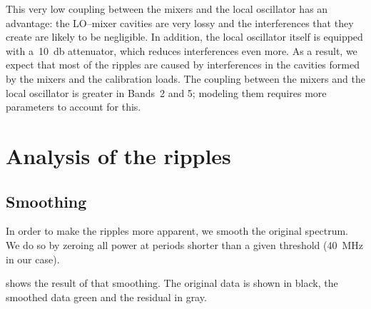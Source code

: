 This very low coupling between the mixers and the local oscillator has an advantage: the LO--mixer cavities are very lossy and the interferences that they create are likely to be negligible.
In addition, the local oscillator itself is equipped with a~\SI{10}{\decibel} attenuator, which reduces interferences even more.
As a result, we expect that most of the ripples are caused by interferences in the cavities formed by the mixers and the calibration loads.
The coupling between the mixers and the local oscillator is greater in Bands~2 and 5; modeling them requires more parameters to account for this.





\FloatBarrier



\section{Analysis of the ripples}




\subsection{Smoothing}
In order to make the ripples more apparent, we smooth the original spectrum.
We do so by zeroing all power at periods shorter than a given threshold (\SI{40}{\mega\hertz} in our case).

 shows the result of that smoothing.
The original data is shown in black, the smoothed data green and the residual in gray.

